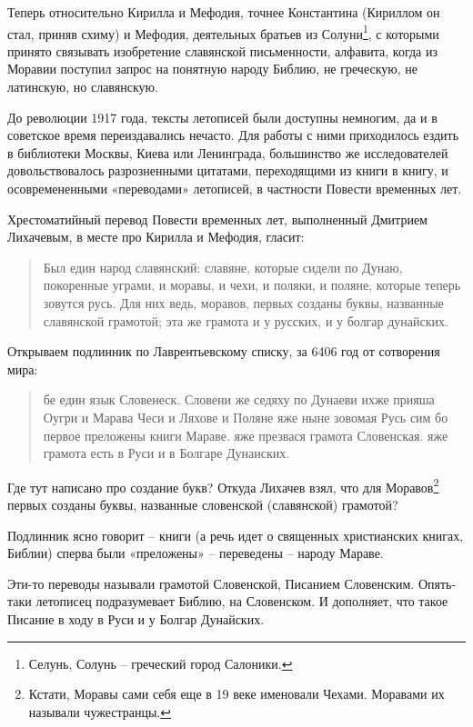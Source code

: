 Теперь относительно Кирилла и Мефодия, точнее Константина (Кириллом он стал, приняв схиму) и Мефодия, деятельных братьев из Солуни\footnote{Селунь, Солунь – греческий город Салоники.}, с которыми принято связывать изобретение славянской письменности, алфавита, когда из Моравии поступил запрос на понятную народу Библию, не греческую, не латинскую, но славянскую.

До революции 1917 года, тексты летописей были доступны немногим, да и в советское время переиздавались нечасто. Для работы с ними приходилось ездить в библиотеки Москвы, Киева или Ленинграда, большинство же исследователей довольствовалось разрозненными цитатами, переходящими из книги в книгу, и осовремененными «переводами» летописей, в частности Повести временных лет.

Хрестоматийный перевод Повести временных лет, выполненный Дмитрием Лихачевым, в месте про Кирилла и Мефодия, гласит: 

\begin{quotation}
Был един народ славянский: славяне, которые сидели по Дунаю, покоренные уграми, и моравы, и чехи, и поляки, и поляне, которые теперь зовутся русь. Для них ведь, моравов, первых созданы буквы, названные славянской грамотой; эта же грамота и у русских, и у болгар дунайских. 
\end{quotation}

Открываем подлинник по Лаврентьевскому списку, за 6406 год от сотворения мира:

\begin{quotation}
бе един язык Словенеск. Словени же седяху по Дунаеви ихже прияша Оугри и Марава Чеси и Ляхове и Поляне яже ныне зовомая Русь сим бо первое преложены книги Мараве. яже презвася грамота Словенская. яже грамота есть в Руси и в Болгаре Дунаиских.
\end{quotation}

Где тут написано про создание букв? Откуда Лихачев взял, что для Моравов\footnote{Кстати, Моравы сами себя еще в 19 веке именовали Чехами. Моравами их называли чужестранцы.} первых созданы буквы, названные словенской (славянской) грамотой?

Подлинник ясно говорит – книги (а речь идет о священных христианских книгах, Библии) сперва были «преложены» – переведены – народу Мараве. 

Эти-то переводы называли грамотой Словенской, Писанием Словенским. Опять-таки летописец подразумевает Библию, на Словенском. И дополняет, что такое Писание в ходу в Руси и у Болгар Дунайских. 

